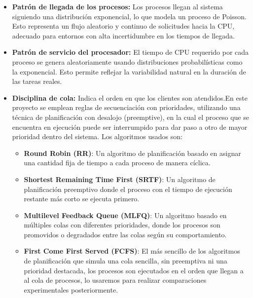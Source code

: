 \documentclass[12pt]{article}
\begin{document}
 
 \begin{itemize}
 	\item \textbf{Patrón de llegada de los procesos:} Los procesos llegan al sistema siguiendo una distribución exponencial, lo que modela un proceso de Poisson. Esto representa un flujo aleatorio y continuo de solicitudes hacia la CPU, adecuado para entornos con alta incertidumbre en los tiempos de llegada.
 	
 	\item \textbf{Patrón de servicio del procesador:} El tiempo de CPU requerido por cada proceso se genera aleatoriamente usando distribuciones probabilísticas como la exponencial. Esto permite reflejar la variabilidad natural en la duración de las tareas reales.
 	
 	\item \textbf{Disciplina de cola:} Indica el orden en que los clientes son atendidos.En este proyecto se emplean reglas de secuenciación con prioridades, utilizando una técnica de planificación con desalojo (preemptive), en la cual el proceso que se encuentra en ejecución puede ser interrumpido para dar paso a otro de mayor prioridad dentro del sistema. Los algoritmos usados son: 
 	
 	\begin{itemize}
 		
 		\item \textbf{Round Robin (RR)}: Un algoritmo de planificación basado en asignar una cantidad fija de tiempo a cada proceso de manera cíclica.
 		
 		\item \textbf{Shortest Remaining Time First (SRTF)}: Un algoritmo de planificación preemptivo donde el proceso con el tiempo de ejecución restante más corto se ejecuta primero.
 		
 		\item \textbf{Multilevel Feedback Queue (MLFQ)}: Un algoritmo basado en múltiples colas con diferentes prioridades, donde los procesos son promovidos o degradados entre las colas según su comportamiento.
 		
 		\item \textbf{First Come First Served (FCFS)}: El m\'as sencillo de los algoritmos de planificaci\'on que simula una cola sencilla, sin preemptiva ni una prioridad destacada, los procesos son ejecutados en el orden que llegan a al cola de procesos, lo usaremos para realizar comparaciones experimentales posteriormente.
 		
 		
 	\end{itemize}
 	

\end{itemize}
\end{document}
